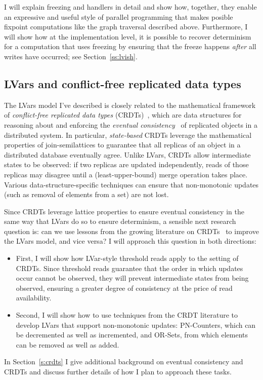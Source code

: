\documentclass{article}
\begin{document}
I will explain freezing and handlers in detail and show how, together,
they enable an expressive and useful style of parallel programming
that makes posible fixpoint computations like the graph traversal
described above.  Furthermore, I will show how at the implementation
level, it is possible to recover determinism for a computation that
uses freezing by ensuring that the freeze happens \emph{after} all
writes have occurred; see Section~\ref{ss:lvish}.

\subsection{LVars and conflict-free replicated data types}

The LVars model I've described is closely related to the mathematical
framework of \emph{conflict-free replicated data types}
(CRDTs)~\cite{crdts}, which are data structures for
reasoning about and enforcing the \emph{eventual
  consistency}~\cite{vogels-ec} of replicated objects in a distributed
system.  In particular, \emph{state-based} CRDTs leverage the
mathematical properties of join-semilattices to guarantee that all
replicas of an object in a distributed database eventually agree.
Unlike LVars, CRDTs allow intermediate states to be observed: if two
replicas are updated independently, reads of those replicas may
disagree until a (least-upper-bound) merge operation takes place.
Various data-structure-specific techniques can ensure that
non-monotonic updates (such as removal of elements from a set) are not
lost.

Since CRDTs leverage lattice properties to ensure eventual consistency
in the same way that LVars do so to ensure determinism, a sensible
next research question is: can we use lessons from the growing
literature on CRDTs~\cite{crdts, crdts-tr, rdts-popl14} to
improve the LVars model, and vice versa?  I will approach this
question in both directions:
\begin{itemize}
\item First, I will show how LVar-style threshold reads apply to the
  setting of CRDTs.  Since threshold reads guarantee that the order in
  which updates occur cannot be observed, they will prevent
  intermediate states from being observed, ensuring a greater degree
  of consistency at the price of read availability.
\item Second, I will show how to use techniques from the CRDT
  literature to develop LVars that support non-monotonic updates:
  PN-Counters, which can be decremented as well as incremented, and
  OR-Sets, from which elements can be removed as well as added.
\end{itemize}
In Section~\ref{s:crdts} I give additional background on eventual
consistency and CRDTs and discuss further details of how I plan to
approach these tasks.
\end{document}
